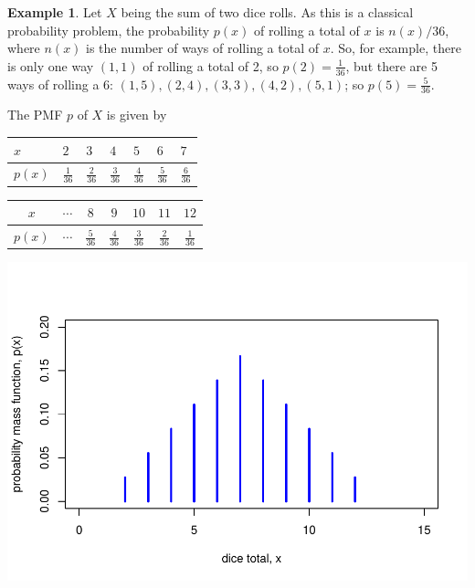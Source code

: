 \documentclass[
  a4paper,
]{book}
\theoremstyle{definition}
\theoremstyle{definition}
\newtheorem{example}{Example}[chapter]
\theoremstyle{definition}
\theoremstyle{definition}
\theoremstyle{remark}
\begin{document}
\begin{example}
Let \(X\) being the sum of two dice rolls. As this is a classical probability problem, the probability \(p(x)\) of rolling a total of \(x\) is \(n(x) / 36\), where \(n(x)\) is the number of ways of rolling a total of \(x\). So, for example, there is only one way \((1,1)\) of rolling a total of 2, so \(p(2) = \frac1{36}\), but there are 5 ways of rolling a 6: \((1,5), (2,4), (3, 3), (4, 2), (5, 1)\); so \(p(5) = \frac5{36}\).

The PMF \(p\) of \(X\) is given by

\begin{longtable}[]{@{}
  >{\centering\arraybackslash}p{}
  >{\centering\arraybackslash}p{}
  >{\centering\arraybackslash}p{}
  >{\centering\arraybackslash}p{}
  >{\centering\arraybackslash}p{}
  >{\centering\arraybackslash}p{}
  >{\centering\arraybackslash}p{}@{}}
\toprule
\(x\) & \(2\) & \(3\) & \(4\) & \(5\) & \(6\) & \(7\) \\
\midrule
\endhead
\(p(x)\) & \(\frac{1}{36}\) & \(\frac{2}{36}\) & \(\frac{3}{36}\) & \(\frac{4}{36}\) & \(\frac{5}{36}\) & \(\frac{6}{36}\) \\
\bottomrule
\end{longtable}

\begin{longtable}[]{@{}ccccccc@{}}
\toprule
\(x\) & \(\cdots\) & \(8\) & \(9\) & \(10\) & \(11\) & \(12\) \\
\midrule
\endhead
\(p(x)\) & \(\cdots\) & \(\frac{5}{36}\) & \(\frac{4}{36}\) & \(\frac{3}{36}\) & \(\frac{2}{36}\) & \(\frac{1}{36}\) \\
\bottomrule
\end{longtable}

\includegraphics{math1710_files/figure-latex/dice-pmf-1.pdf}
\end{example}
\end{document}
